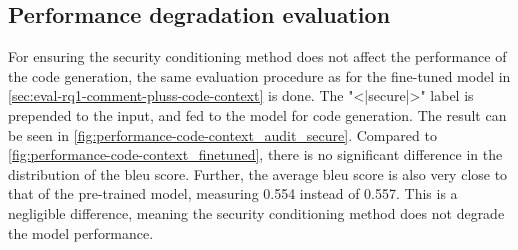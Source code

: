 




\subsection{Performance degradation evaluation}
\label{sec:rq2-performance-degradation-evaluation}
For ensuring the security conditioning method does not affect the performance of the code generation, the same evaluation procedure as for the fine-tuned model in \cref{sec:eval-rq1-comment-pluss-code-context} is done. The "<|secure|>" label is prepended to the input, and fed to the model for code generation. The result can be seen in \cref{fig:performance-code-context_audit_secure}. Compared to \cref{fig:performance-code-context_finetuned}, there is no significant difference in the distribution of the \acrshort{bleu} score. Further, the average \acrshort{bleu} score is also very close to that of the pre-trained model, measuring 0.554 instead of 0.557. This is a negligible difference, meaning the security conditioning method does not degrade the model performance.

